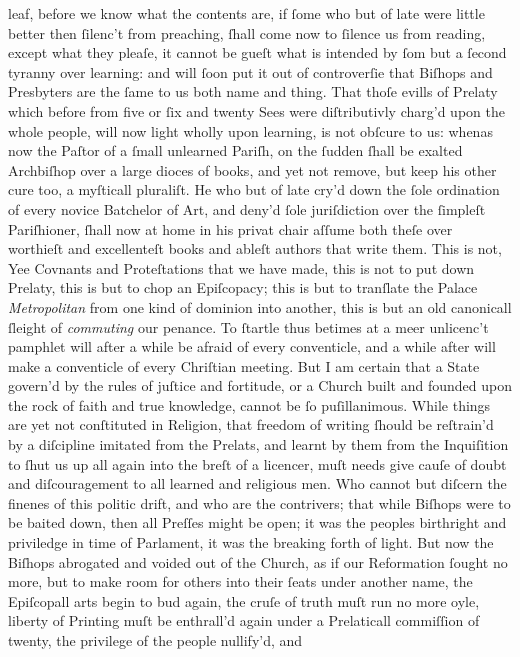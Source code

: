 leaf, before we know what the contents are, if ſome who but of late were little
better then ſilenc't from preaching, ſhall come now to ſilence us from reading,
except what they pleaſe, it cannot be gueſt what is intended by ſom but a ſecond
tyranny over learning: and will ſoon put it out of controverſie that Biſhops and
Presbyters are the ſame to us both name and thing.  That thoſe evills of Prelaty
which before from five or ſix and twenty Sees were diſtributivly charg'd upon
the whole people, will now light wholly upon learning, is not obſcure to us:
whenas now the Paſtor of a ſmall unlearned Pariſh, on the ſudden ſhall be
exalted Archbiſhop over a large dioces of books, and yet not remove, but keep
his other cure too, a myſticall pluraliſt.  He who but of late cry'd down the
ſole ordination of every novice Batchelor of Art, and deny'd ſole juriſdiction
over the ſimpleſt Pariſhioner, ſhall now at home in his privat chair aſſume both
theſe over worthieſt and excellenteſt books and ableſt authors that write them.
This is not, Yee Covnants and Proteſtations that we have made, this is not to
put down Prelaty, this is but to chop an Epiſcopacy; this is but to tranſlate
the Palace \textit{Metropolitan} from one kind of dominion into another, this is
but an old canonicall ſleight of \textit{commuting} our penance.  To ſtartle
thus betimes at a meer unlicenc't pamphlet will after a while be afraid of every
conventicle, and a while after will make a conventicle of every Chriſtian
meeting.  But I am certain that a State govern'd by the rules of juſtice and
fortitude, or a Church built and founded upon the rock of faith and true
knowledge, cannot be ſo puſillanimous.  While things are yet not conſtituted in
Religion, that freedom of writing ſhould be reſtrain'd by a diſcipline imitated
from the Prelats, and learnt by them from the Inquiſition to ſhut us up all
again into the breſt of a licencer, muſt needs give cauſe of doubt and
diſcouragement to all learned and religious men.  Who cannot but diſcern the
finenes of this politic drift, and who are the contrivers; that while Biſhops
were to be baited down, then all Preſſes might be open; it was the peoples
birthright and priviledge in time of Parlament, it was the breaking forth of
light.  But now the Biſhops abrogated and voided out of the Church, as if our
Reformation ſought no more, but to make room for others into their ſeats under
another name, the Epiſcopall arts begin to bud again, the cruſe of truth muſt
run no more oyle, liberty of Printing muſt be enthrall'd again under a
Prelaticall commiſſion of twenty, the privilege of the people nullify'd, and
